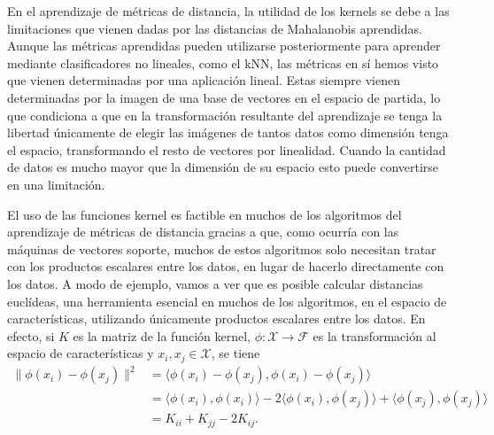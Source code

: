 En el aprendizaje de métricas de distancia, la utilidad de los kernels se debe a las limitaciones que vienen dadas por las distancias de Mahalanobis aprendidas. Aunque las métricas aprendidas pueden utilizarse posteriormente para aprender mediante clasificadores no lineales, como el kNN, las métricas en sí hemos visto que vienen determinadas por una aplicación lineal. Estas siempre vienen determinadas por la imagen de una base de vectores en el espacio de partida, lo que condiciona a que en la transformación resultante del aprendizaje se tenga la libertad únicamente de elegir las imágenes de tantos datos como dimensión tenga el espacio, transformando el resto de vectores por linealidad. Cuando la cantidad de datos es mucho mayor que la dimensión de su espacio esto puede convertirse en una limitación.

El uso de las funciones kernel es factible en muchos de los algoritmos del aprendizaje de métricas de distancia gracias a que, como ocurría con las máquinas de vectores soporte, muchos de estos algoritmos solo necesitan tratar con los productos escalares entre los datos, en lugar de hacerlo directamente con los datos. A modo de ejemplo, vamos a ver que es posible calcular distancias euclídeas, una herramienta esencial en muchos de los algoritmos, en el espacio de características, utilizando únicamente productos escalares entre los datos. En efecto, si $K$ es la matriz de la función kernel, $\phi\colon \mathcal{X} \to \mathcal{F}$ es la transformación al espacio de características y $x_i,x_j \in \mathcal{X}$, se tiene
\begin{equation} \label{eq:dist_features}
    \begin{split}
    \|\phi(x_i)-\phi(x_j)\|^2 &= \langle \phi(x_i)-\phi(x_j), \phi(x_i) - \phi(x_j) \rangle \\
                              &= \langle \phi(x_i),\phi(x_i) \rangle - 2 \langle\phi(x_i), \phi(x_j) \rangle + \langle \phi(x_j), \phi(x_j) \rangle \\
                              &= K_{ii} + K_{jj} -2K_{ij}.
    \end{split}
\end{equation}

